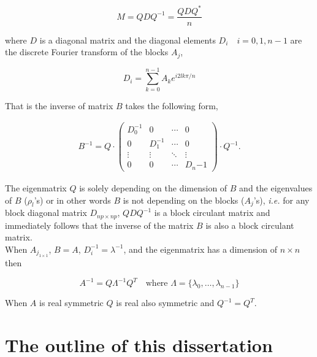 \[
M = QDQ^{-1} = \frac{QDQ^*}{n}
\]

where $D$ is a diagonal matrix and the diagonal elements $D_i \quad i=0,1, n-1$ are the discrete Fourier transform of the blocks $A_j$,

\[
D_i = \sum_{k=0}^{n-1} A_k e^{i2lk\pi/n}
\]

That is the inverse of matrix $B$ takes the following form,

\begin{eqnarray*}
	B^{-1} = Q\cdot\left(
		\begin{array}{llll}
			D_0^{-1}  & 0              & \cdots & 0 \\
			0         & D_1^{-1}       & \cdots & 0 \\
			\vdots    & \vdots         & \ddots & \vdots  \\
			0         & 0              & \cdots & D_n{-1}
		\end{array}
	\right)\cdot Q^{-1}.
\end{eqnarray*}

The eigenmatrix $Q$ is solely depending on the dimension of $B$ and the eigenvalues of $B$ ($\rho_l$'s) or in other words $B$ is not depending on the blocks ($A_j$'s), {\em i.e.} for any block diagonal matrix $D_{np \times np}$, $QDQ^{-1}$ is a block circulant matrix and immediately follows that the inverse of the matrix $B$ is also a block circulant matrix.\\

When $A_{j_{1\times 1}}$, $B=A$, $D_i^{-1}=\lambda^{-1}$, and the eigenmatrix has a dimension of $n\times n$ then

\[
A^{-1} = Q \Lambda^{-1} Q^T \quad \mbox{where $\Lambda = \{\lambda_0, \ldots, \lambda_{n-1} \}$}
\]

When $A$ is real symmetric $Q$ is real also symmetric and $Q^{-1}=Q^T$.\\



\section{The outline of this dissertation}

